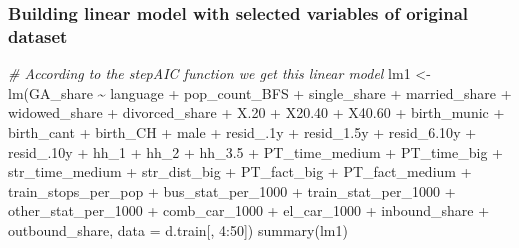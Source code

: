 \documentclass[
]{article}
\newenvironment{Shaded}{\begin{snugshade}}{\end{snugshade}}
\newcommand{\AttributeTok}[1]{\textcolor[rgb]{0.77,0.63,0.00}{#1}}
\newcommand{\CommentTok}[1]{\textcolor[rgb]{0.56,0.35,0.01}{\textit{#1}}}
\newcommand{\DecValTok}[1]{\textcolor[rgb]{0.00,0.00,0.81}{#1}}
\newcommand{\FloatTok}[1]{\textcolor[rgb]{0.00,0.00,0.81}{#1}}
\newcommand{\FunctionTok}[1]{\textcolor[rgb]{0.00,0.00,0.00}{#1}}
\newcommand{\NormalTok}[1]{#1}
\newcommand{\OtherTok}[1]{\textcolor[rgb]{0.56,0.35,0.01}{#1}}
\newcommand{\SpecialCharTok}[1]{\textcolor[rgb]{0.00,0.00,0.00}{#1}}
\begin{document}
\hypertarget{building-linear-model-with-selected-variables-of-original-dataset}{%
\subsubsection{Building linear model with selected variables of original
dataset}\label{building-linear-model-with-selected-variables-of-original-dataset}}

\begin{Shaded}
\begin{Highlighting}[]
\CommentTok{\# According to the stepAIC function we get this linear model}
\NormalTok{lm1 }\OtherTok{\textless{}{-}} \FunctionTok{lm}\NormalTok{(GA\_share }\SpecialCharTok{\textasciitilde{}}\NormalTok{ language }\SpecialCharTok{+}\NormalTok{ pop\_count\_BFS }\SpecialCharTok{+}\NormalTok{ single\_share }\SpecialCharTok{+} 
\NormalTok{    married\_share }\SpecialCharTok{+}\NormalTok{ widowed\_share }\SpecialCharTok{+}\NormalTok{ divorced\_share }\SpecialCharTok{+}\NormalTok{ X}\FloatTok{.20} \SpecialCharTok{+}\NormalTok{ X20}\FloatTok{.40} \SpecialCharTok{+} 
\NormalTok{    X40}\FloatTok{.60} \SpecialCharTok{+}\NormalTok{ birth\_munic }\SpecialCharTok{+}\NormalTok{ birth\_cant }\SpecialCharTok{+}\NormalTok{ birth\_CH }\SpecialCharTok{+}\NormalTok{ male }\SpecialCharTok{+}\NormalTok{ resid\_}\FloatTok{.1}\NormalTok{y }\SpecialCharTok{+} 
\NormalTok{    resid\_1}\FloatTok{.5}\NormalTok{y }\SpecialCharTok{+}\NormalTok{ resid\_6}\FloatTok{.10}\NormalTok{y }\SpecialCharTok{+}\NormalTok{ resid\_}\FloatTok{.10}\NormalTok{y }\SpecialCharTok{+}\NormalTok{ hh\_1 }\SpecialCharTok{+}\NormalTok{ hh\_2 }\SpecialCharTok{+}\NormalTok{ hh\_3}\FloatTok{.5} \SpecialCharTok{+} 
\NormalTok{    PT\_time\_medium }\SpecialCharTok{+}\NormalTok{ PT\_time\_big }\SpecialCharTok{+}\NormalTok{ str\_time\_medium }\SpecialCharTok{+}\NormalTok{ str\_dist\_big }\SpecialCharTok{+} 
\NormalTok{    PT\_fact\_big }\SpecialCharTok{+}\NormalTok{ PT\_fact\_medium }\SpecialCharTok{+}\NormalTok{ train\_stops\_per\_pop }\SpecialCharTok{+}\NormalTok{ bus\_stat\_per\_1000 }\SpecialCharTok{+} 
\NormalTok{    train\_stat\_per\_1000 }\SpecialCharTok{+}\NormalTok{ other\_stat\_per\_1000 }\SpecialCharTok{+}\NormalTok{ comb\_car\_1000 }\SpecialCharTok{+} 
\NormalTok{    el\_car\_1000 }\SpecialCharTok{+}\NormalTok{ inbound\_share }\SpecialCharTok{+}\NormalTok{ outbound\_share, }\AttributeTok{data =}\NormalTok{ d.train[, }
    \DecValTok{4}\SpecialCharTok{:}\DecValTok{50}\NormalTok{]) }
\FunctionTok{summary}\NormalTok{(lm1)}
\end{Highlighting}
\end{Shaded}
\end{document}
